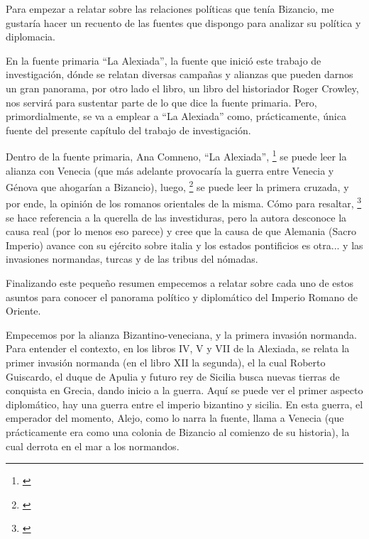 Para empezar a relatar sobre las relaciones políticas que tenía Bizancio,
me gustaría hacer un recuento de las fuentes que dispongo para analizar
su política y diplomacia.

En la fuente primaria “La Alexiada”, 
la fuente que inició este trabajo de investigación, 
dónde se relatan diversas campañas y alianzas 
que pueden darnos un gran panorama, 
por otro lado el libro, un libro del historiador Roger Crowley, 
nos servirá para sustentar parte de lo que dice la fuente primaria. 
Pero, primordialmente, 
se va a emplear a “La Alexiada” como, prácticamente, 
única fuente del presente capítulo del trabajo de investigación.

Dentro de la fuente primaria,  Ana Comneno, “La Alexiada”,
\footnote{\cite[]{alexiadaVI}}
se puede leer la alianza con Venecia (que más adelante provocaría 
la guerra entre Venecia y Génova que ahogarían a Bizancio), luego,
\footnote{\cite[pp.~419--460]{alexiadaX}}
se puede leer la 
primera cruzada, y por ende, la opinión de los romanos 
orientales de la misma. Cómo para resaltar,
\footnote{\cite[]{alexiadaV}}
se hace referencia a la querella de las investiduras, 
pero la autora desconoce la causa real (por lo menos eso parece) 
y cree que la causa de que Alemania (Sacro Imperio)
avance con su ejército sobre italia y los estados
pontificios es otra...
y las invasiones normandas, 
turcas y de las tribus del nómadas. 

Finalizando este pequeño resumen empecemos a 
relatar sobre cada uno de estos asuntos para conocer el 
panorama político y diplomático del Imperio Romano de Oriente.

Empecemos por la alianza Bizantino-veneciana, y la primera 
invasión normanda. Para entender el contexto, en los libros 
IV, V y VII de la Alexiada, se relata la primer invasión normanda 
(en el libro XII la segunda), el la cual Roberto Guiscardo, 
el duque de Apulia y futuro rey de Sicilia busca nuevas tierras de 
conquista en Grecia, dando inicio a la guerra. Aquí se puede ver el 
primer aspecto diplomático, hay una guerra entre el imperio bizantino 
y sicilia. En esta guerra, el emperador del momento, Alejo, 
como lo narra la fuente, llama a Venecia (que prácticamente 
era como una colonia de Bizancio al comienzo de su historia), 
la cual derrota en el mar a los normandos.

